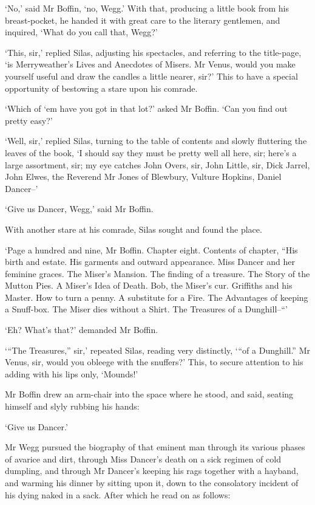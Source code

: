 ‘No,’ said Mr Boffin, ‘no, Wegg.’ With that, producing a little book
from his breast-pocket, he handed it with great care to the literary
gentlemen, and inquired, ‘What do you call that, Wegg?’

‘This, sir,’ replied Silas, adjusting his spectacles, and referring to
the title-page, ‘is Merryweather’s Lives and Anecdotes of Misers. Mr
Venus, would you make yourself useful and draw the candles a little
nearer, sir?’ This to have a special opportunity of bestowing a stare
upon his comrade.

‘Which of ‘em have you got in that lot?’ asked Mr Boffin. ‘Can you find
out pretty easy?’

‘Well, sir,’ replied Silas, turning to the table of contents and slowly
fluttering the leaves of the book, ‘I should say they must be pretty
well all here, sir; here’s a large assortment, sir; my eye catches John
Overs, sir, John Little, sir, Dick Jarrel, John Elwes, the Reverend Mr
Jones of Blewbury, Vulture Hopkins, Daniel Dancer--’

‘Give us Dancer, Wegg,’ said Mr Boffin.

With another stare at his comrade, Silas sought and found the place.

‘Page a hundred and nine, Mr Boffin. Chapter eight. Contents of chapter,
“His birth and estate. His garments and outward appearance. Miss Dancer
and her feminine graces. The Miser’s Mansion. The finding of a treasure.
The Story of the Mutton Pies. A Miser’s Idea of Death. Bob, the Miser’s
cur. Griffiths and his Master. How to turn a penny. A substitute for a
Fire. The Advantages of keeping a Snuff-box. The Miser dies without a
Shirt. The Treasures of a Dunghill--“’

‘Eh? What’s that?’ demanded Mr Boffin.

‘“The Treasures,” sir,’ repeated Silas, reading very distinctly, ‘“of a
Dunghill.” Mr Venus, sir, would you obleege with the snuffers?’ This, to
secure attention to his adding with his lips only, ‘Mounds!’

Mr Boffin drew an arm-chair into the space where he stood, and said,
seating himself and slyly rubbing his hands:

‘Give us Dancer.’

Mr Wegg pursued the biography of that eminent man through its various
phases of avarice and dirt, through Miss Dancer’s death on a sick
regimen of cold dumpling, and through Mr Dancer’s keeping his rags
together with a hayband, and warming his dinner by sitting upon it, down
to the consolatory incident of his dying naked in a sack. After which he
read on as follows:

